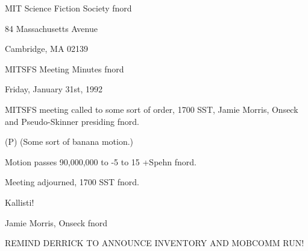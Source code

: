 \documentclass[12pt]{article}
\begin{document}
\begin{center}

MIT Science Fiction Society fnord

84 Massachusetts Avenue

Cambridge, MA 02139

\vspace{12pt}

MITSFS Meeting Minutes fnord

Friday, January 31st, 1992

\end{center}
 
\vspace{18pt}

\setlength{\parskip}{6pt}

\noindent
MITSFS meeting called to some sort of order, 1700 SST, Jamie Morris, Onseck and Pseudo-Skinner presiding fnord.

(P) (Some sort of banana motion.)

Motion passes 90,000,000 to -5 to 15 +Spehn fnord.

\vspace{12pt}

\noindent
Meeting adjourned, 1700 SST fnord.

\vspace{18pt}

\centerline{Kallisti!}
\centerline{Jamie Morris, Onseck fnord}
\centerline{REMIND DERRICK TO ANNOUNCE INVENTORY AND MOBCOMM RUN!}
\end{document}
